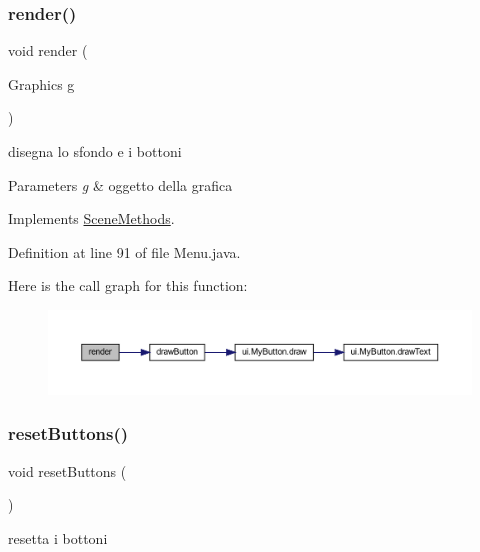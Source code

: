 \subsubsection{\texorpdfstring{render()}{render()}}
{\footnotesize\ttfamily void render (\begin{DoxyParamCaption}\item[{Graphics}]{g }\end{DoxyParamCaption})}



disegna lo sfondo e i bottoni 


\begin{DoxyParams}{Parameters}
{\em g} & oggetto della grafica \\
\hline
\end{DoxyParams}


Implements \hyperlink{interfacescenes_1_1_scene_methods_a203b6ad9d5e4d54dd1152986eec4dedc}{Scene\+Methods}.



Definition at line 91 of file Menu.\+java.

Here is the call graph for this function\+:\nopagebreak
\begin{figure}[H]
\begin{center}
\leavevmode
\includegraphics[width=350pt]{classscenes_1_1_menu_a203b6ad9d5e4d54dd1152986eec4dedc_cgraph}
\end{center}
\end{figure}
\mbox{\label{classscenes_1_1_menu_a548cf4795e9d559d0c0cce0bb57a5251}} 
\subsubsection{\texorpdfstring{reset\+Buttons()}{resetButtons()}}
{\footnotesize\ttfamily void reset\+Buttons (\begin{DoxyParamCaption}{ }\end{DoxyParamCaption})}



resetta i bottoni 




